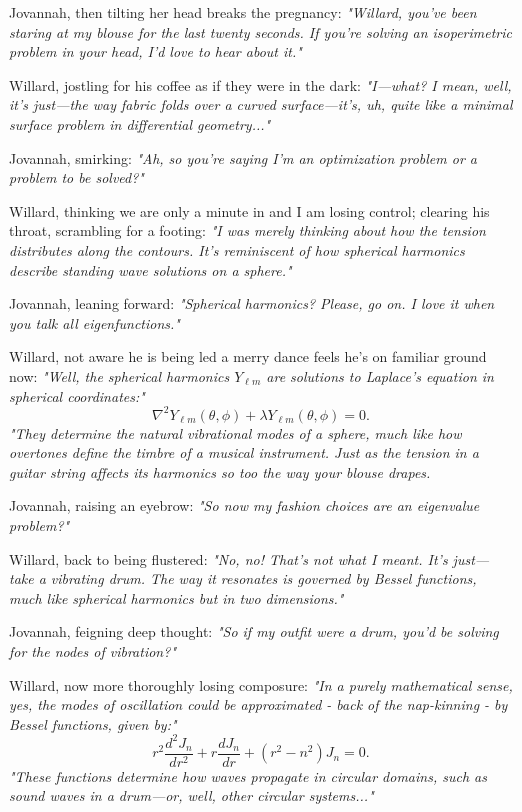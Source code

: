 Jovannah, then tilting her head breaks the pregnancy: \textit{"Willard, you've been staring at my blouse for the last twenty seconds. If you're solving an isoperimetric problem in your head, I'd love to hear about it."}

Willard, jostling for his coffee as if they were in the dark: \textit{"I—what? I mean, well, it's just—the way fabric folds over a curved surface—it's, uh, quite like a minimal surface problem in differential geometry..."}

Jovannah, smirking: \textit{"Ah, so you're saying I’m an optimization problem or a problem to be solved?"}

Willard, thinking we are only a minute in and I am losing control; clearing his throat, scrambling for a footing: \textit{"I was merely thinking about how the tension distributes along the contours. It’s reminiscent of how spherical harmonics describe standing wave solutions on a sphere."}

Jovannah, leaning forward: \textit{"Spherical harmonics? Please, go on. I love it when you talk all eigenfunctions."}

Willard, not aware he is being led a merry dance feels he's on familiar ground now: \textit{"Well, the spherical harmonics $Y_{\ell m}$ are solutions to Laplace’s equation in spherical coordinates:"}
\begin{equation*}
\nabla^2 Y_{\ell m}(\theta, \phi) + \lambda Y_{\ell m}(\theta, \phi) = 0.
\end{equation*}
\textit{"They determine the natural vibrational modes of a sphere, much like how overtones define the timbre of a musical instrument. Just as the tension in a guitar string affects its harmonics so too the way your blouse drapes.}


Jovannah, raising an eyebrow: \textit{"So now my fashion choices are an eigenvalue problem?"}

Willard, back to being flustered: \textit{"No, no! That’s not what I meant. It’s just—take a vibrating drum. The way it resonates is governed by Bessel functions, much like spherical harmonics but in two dimensions."}

Jovannah, feigning deep thought: \textit{"So if my outfit were a drum, you'd be solving for the nodes of vibration?"}

Willard, now more thoroughly losing composure: \textit{"In a purely mathematical sense, yes, the modes of oscillation could be approximated - back of the nap-kinning - by Bessel functions, given by:"}
\begin{equation*}
 r^2 \frac{d^2 J_n}{dr^2} + r \frac{d J_n}{dr} + (r^2 - n^2) J_n = 0.
\end{equation*}
\textit{"These functions determine how waves propagate in circular domains, such as sound waves in a drum—or, well, other circular systems..."}

